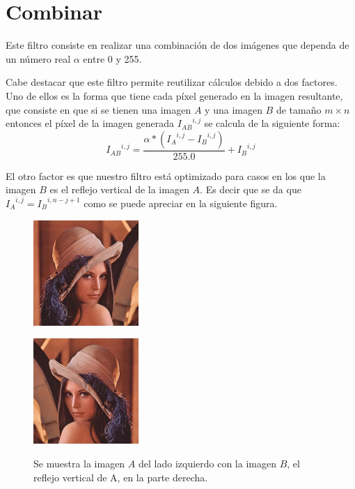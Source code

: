 \section{Combinar}
\par{Este filtro consiste en realizar una combinación de dos imágenes que dependa de un número real $\alpha$ entre 0 y 255.}
\par{Cabe destacar que este filtro permite reutilizar cálculos debido a dos factores. Uno de ellos es la forma que tiene cada píxel generado en la imagen resultante, que consiste en que si se tienen una imagen $A$ y una imagen $B$ de tamaño $m \times n$ entonces el píxel de la imagen generada ${I_{AB}}^{i, j}$ se calcula de la siguiente forma:}
\[ {I_{AB}}^{i,j} = \dfrac{\alpha * ( {I_{A}}^{i,j} - {I_{B}}^{i,j} )}{255.0} + {I_{B}}^{i,j} \]
\par{El otro factor es que nuestro filtro está optimizado para casos en los que la imagen $B$ es el reflejo vertical de la imagen $A$. Es decir que se da que ${I_{A}}^{i,j} = {I_{B}}^{i,n - j + 1}$ como se puede apreciar en la siguiente figura.}

\begin{figure}[h!]
\centering
\begin{minipage}{.5\textwidth}
\centering
\captionsetup{justification=centering}
\includegraphics[width=4cm, height=4cm]{imagenes/CombinarOriginal.jpg}
\label{}
\end{minipage}\hfill
\begin{minipage}{.5\textwidth}
\centering
\captionsetup{justification=centering}
\includegraphics[width=4cm, height=4cm]{imagenes/CombinarReflejo.jpg}
\label{}
\end{minipage}
\caption[center]{Se muestra la imagen $A$ del lado izquierdo con la imagen $B$, el reflejo vertical de A, en la parte derecha.}
\end{figure}

